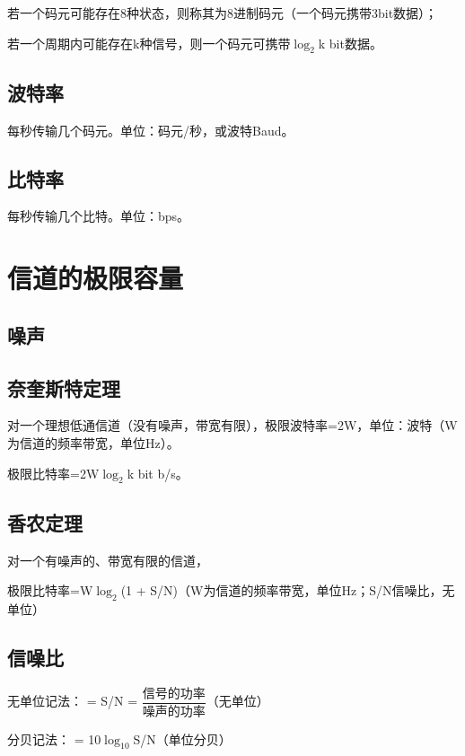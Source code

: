 若一个码元可能存在8种状态，则称其为8进制码元（一个码元携带3bit数据）；

若一个周期内可能存在k种信号，则一个码元可携带\(\log_2\)k bit数据。


\subsection{波特率}
每秒传输几个码元。单位：码元/秒，或波特Baud。


\subsection{比特率}
每秒传输几个比特。单位：bps。


\section{信道的极限容量}

\subsection{噪声}


\subsection{奈奎斯特定理}
对一个理想低通信道（没有噪声，带宽有限），极限波特率=2W，单位：波特（W为信道的频率带宽，单位Hz）。

极限比特率=2W\(\log_2\)k bit b/s。


\subsection{香农定理}
对一个有噪声的、带宽有限的信道，

极限比特率=W\(\log_2\)(1 + S/N)（W为信道的频率带宽，单位Hz；S/N信噪比，无单位）


\subsection{信噪比}
无单位记法： = S/N = \(\dfrac{\text{信号的功率}}{\text{噪声的功率}}\)（无单位）

分贝记法： = 10\(\log_{10}\)S/N（单位分贝）






